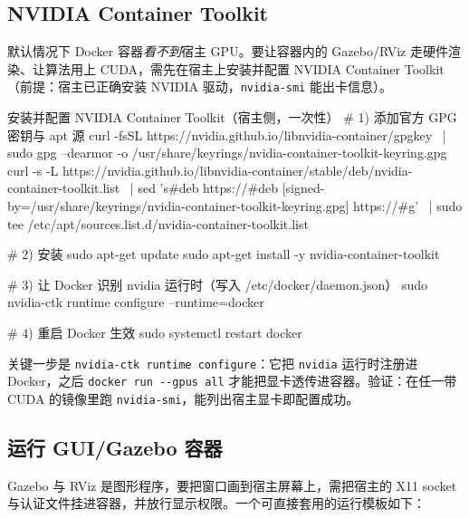 \subsection{NVIDIA Container Toolkit}

默认情况下 Docker 容器\emph{看不到}宿主 GPU。要让容器内的 Gazebo/RViz 走硬件渲染、让算法用上 CUDA，需先在宿主上安装并配置 NVIDIA Container Toolkit（前提：宿主已正确安装 NVIDIA 驱动，\verb|nvidia-smi| 能出卡信息）。

\begin{codebox}[bash]{安装并配置 NVIDIA Container Toolkit（宿主侧，一次性）}
# 1) 添加官方 GPG 密钥与 apt 源
curl -fsSL https://nvidia.github.io/libnvidia-container/gpgkey \
  | sudo gpg --dearmor -o /usr/share/keyrings/nvidia-container-toolkit-keyring.gpg
curl -s -L https://nvidia.github.io/libnvidia-container/stable/deb/nvidia-container-toolkit.list \
  | sed 's#deb https://#deb [signed-by=/usr/share/keyrings/nvidia-container-toolkit-keyring.gpg] https://#g' \
  | sudo tee /etc/apt/sources.list.d/nvidia-container-toolkit.list

# 2) 安装
sudo apt-get update
sudo apt-get install -y nvidia-container-toolkit

# 3) 让 Docker 识别 nvidia 运行时（写入 /etc/docker/daemon.json）
sudo nvidia-ctk runtime configure --runtime=docker

# 4) 重启 Docker 生效
sudo systemctl restart docker
\end{codebox}

关键一步是 \verb|nvidia-ctk runtime configure|：它把 \verb|nvidia| 运行时注册进 Docker，之后 \verb|docker run --gpus all| 才能把显卡透传进容器。验证：在任一带 CUDA 的镜像里跑 \verb|nvidia-smi|，能列出宿主显卡即配置成功。

\subsection{运行 GUI/Gazebo 容器}

Gazebo 与 RViz 是图形程序，要把窗口画到宿主屏幕上，需把宿主的 X11 socket 与认证文件挂进容器，并放行显示权限。一个可直接套用的运行模板如下：


